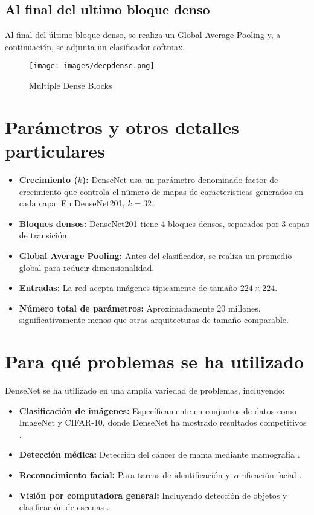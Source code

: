 \documentclass{article}
\begin{document}
\subsection{Al final del ultimo bloque denso}
Al final del último bloque denso, se realiza un Global Average Pooling  y, a continuación, se adjunta un clasificador softmax.


\begin{figure}[!ht]
  \centering
  \texttt{[image: images/deepdense.png]}
  \caption{Multiple Dense Blocks}
\end{figure}

\section{Parámetros y otros detalles particulares}
\begin{itemize}
  \item \textbf{Crecimiento (\(k\)):} DenseNet usa un parámetro denominado factor de crecimiento que controla el número de mapas de características generados en cada capa. En DenseNet201, \(k = 32\).
  \item \textbf{Bloques densos:} DenseNet201 tiene 4 bloques densos, separados por 3 capas de transición.
  \item \textbf{Global Average Pooling:} Antes del clasificador, se realiza un promedio global para reducir dimensionalidad.
  \item \textbf{Entradas:} La red acepta imágenes típicamente de tamaño \(224 \times 224\).
  \item \textbf{Número total de parámetros:} Aproximadamente 20 millones, significativamente menos que otras arquitecturas de tamaño comparable.
\end{itemize}


\section{Para qué problemas se ha utilizado}

DenseNet se ha utilizado en una amplia variedad de problemas, incluyendo:
\begin{itemize}
    \item \textbf{Clasificación de imágenes:} Específicamente en conjuntos de datos como ImageNet y CIFAR-10, donde DenseNet ha mostrado resultados competitivos \cite{huang2018denselyconnectedconvolutionalnetworks}.
    \item \textbf{Detección médica:} Detección del cáncer de mama mediante mamografía \cite{ABDELRAHMAN2021104248}.
    \item \textbf{Reconocimiento facial:} Para tareas de identificación y verificación facial \cite{inbook}.
    \item \textbf{Visión por computadora general:} Incluyendo detección de objetos y clasificación de escenas \cite{AGGARWAL2022105350}.
\end{itemize}
\end{document}
